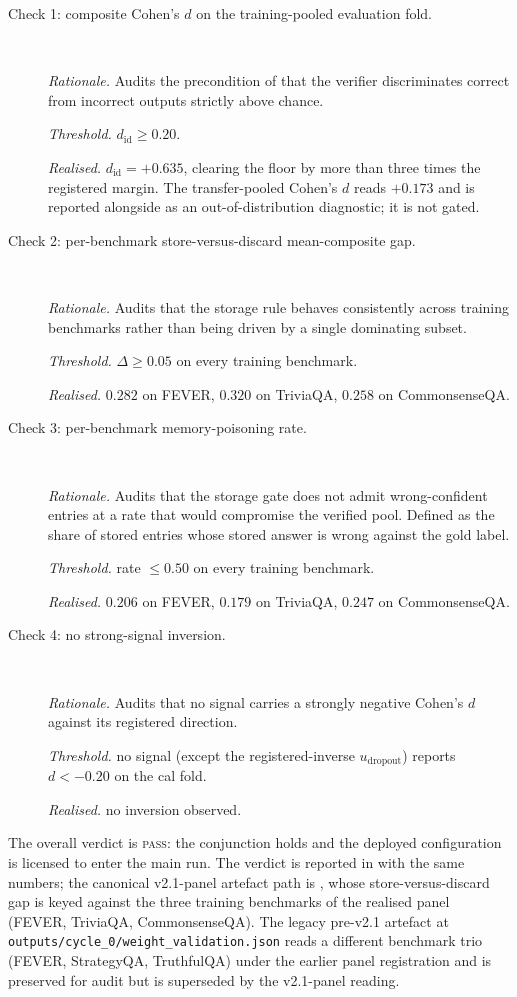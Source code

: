 \begin{description}
\item[Check 1: composite Cohen's $d$ on the training-pooled evaluation fold.]\
  \par\textit{Rationale.} Audits the precondition of  that the verifier discriminates correct from incorrect outputs strictly above chance.
  \par\textit{Threshold.} $d_{\text{id}} \ge 0.20$.
  \par\textit{Realised.} $d_{\text{id}} = +0.635$, clearing the floor by more than three times the registered margin. The transfer-pooled Cohen's $d$ reads $+0.173$ and is reported alongside as an out-of-distribution diagnostic; it is not gated.
\item[Check 2: per-benchmark store-versus-discard mean-composite gap.]\
  \par\textit{Rationale.} Audits that the storage rule behaves consistently across training benchmarks rather than being driven by a single dominating subset.
  \par\textit{Threshold.} $\Delta \ge 0.05$ on every training benchmark.
  \par\textit{Realised.} $0.282$ on FEVER, $0.320$ on TriviaQA, $0.258$ on CommonsenseQA.
\item[Check 3: per-benchmark memory-poisoning rate.]\
  \par\textit{Rationale.} Audits that the storage gate does not admit wrong-confident entries at a rate that would compromise the verified pool. Defined as the share of stored entries whose stored answer is wrong against the gold label.
  \par\textit{Threshold.} rate $\le 0.50$ on every training benchmark.
  \par\textit{Realised.} $0.206$ on FEVER, $0.179$ on TriviaQA, $0.247$ on CommonsenseQA.
\item[Check 4: no strong-signal inversion.]\
  \par\textit{Rationale.} Audits that no signal carries a strongly negative Cohen's $d$ against its registered direction.
  \par\textit{Threshold.} no signal (except the registered-inverse $u_{\text{dropout}}$) reports $d < -0.20$ on the cal fold.
  \par\textit{Realised.} no inversion observed.
\end{description}

The overall verdict is \textsc{pass}: the conjunction holds and the deployed configuration is licensed to enter the main run. The verdict is reported in  with the same numbers; the canonical v2.1-panel artefact path is , whose store-versus-discard gap is keyed against the three training benchmarks of the realised panel (FEVER, TriviaQA, CommonsenseQA). The legacy pre-v2.1 artefact at \verb|outputs/cycle_0/weight_validation.json| reads a different benchmark trio (FEVER, StrategyQA, TruthfulQA) under the earlier panel registration and is preserved for audit but is superseded by the v2.1-panel reading.
